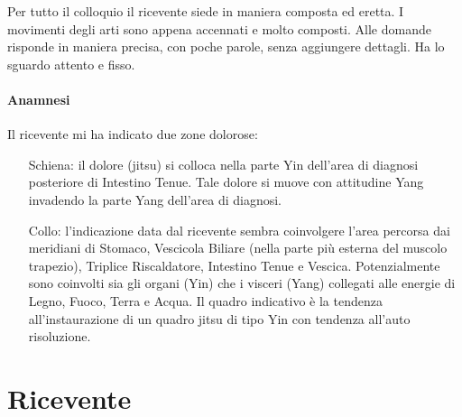\documentclass[12pt, openright, twoside]{report}
\newcommand{\yang}{Yang}
\begin{document}
Per tutto il colloquio il ricevente siede in maniera composta ed eretta.
I movimenti degli arti sono appena accennati e molto composti.
Alle domande risponde in maniera precisa, con poche parole, senza aggiungere
dettagli.
Ha lo sguardo attento e fisso.

\subsubsection*{Anamnesi}
Il ricevente mi ha indicato due zone dolorose:
\begin{itemize}[font=\bfseries, align=left]
\item[Schiena:] il dolore (jitsu) si colloca nella parte Yin dell’area di diagnosi posteriore di Intestino Tenue. Tale dolore si muove con attitudine Yang invadendo la parte Yang dell’area di diagnosi.

\item[Collo:] l’indicazione data dal ricevente sembra coinvolgere l’area percorsa dai meridiani di Stomaco, Vescicola Biliare (nella parte più esterna del muscolo trapezio), Triplice Riscaldatore,  Intestino Tenue e Vescica. Potenzialmente sono coinvolti sia gli organi (Yin) che i visceri (\yang) collegati alle energie di Legno, Fuoco, Terra e Acqua. Il quadro indicativo è la tendenza all’instaurazione di un quadro jitsu di tipo Yin con tendenza all'auto risoluzione.
\end{itemize}
\chapter*{Ricevente}
\end{document}
